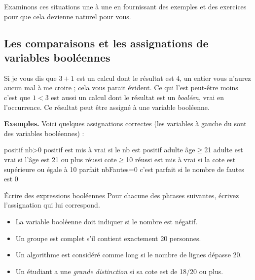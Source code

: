 		Examinons ces situations une à une
		en fournissant des exemples et des exercices
		pour que cela devienne naturel pour vous.
		
		\subsection{Les comparaisons et les assignations de variables booléennes}
		
			Si je vous dis que $3+1$ est un calcul
			dont le résultat est $4$, un entier
			vous n'aurez aucun mal à me croire ; 
			cela vous parait évident.
			Ce qui l'est peut-être moins c'est que $1<3$ est aussi
			un calcul dont le résultat est un \emph{booléen},
			vrai en l’occurrence. 
			Ce résultat peut être assigné à une variable booléenne.			

			\textbf{Exemples.}
			Voici quelques assignations correctes 
			(les variables à gauche du \Gets sont des variables booléennes) :
			\begin{LDA}
				\Let positif \Gets nb>0 \RComment positif est mis à vrai si le nb est positif 
				\Let adulte \Gets âge$\ge$21 \RComment adulte est vrai si l'âge est 21 ou plus
				\Let réussi \Gets cote$\ge$10 \RComment réussi est mis à vrai si la cote est supérieure ou égale à 10
				\Let parfait \Gets nbFautes=0 \RComment c'est parfait si le nombre de fautes est 0
			\end{LDA}
		
			\begin{Exercice}{Écrire des expressions booléennes}
				Pour chacune des phrases suivantes,
				écrivez l'assignation qui lui correspond.
				\begin{itemize}
				\item 
					La variable booléenne 
					doit indiquer si le nombre  est négatif.
				\item
					Un groupe est complet s'il contient exactement 20 personnes.
				\item
					Un algorithme est considéré comme long si le nombre de lignes
					dépasse 20.
				\item 
					Un étudiant a une \emph{grande distinction} si sa cote est
					de 18/20 ou plus.
				\end{itemize}
			\end{Exercice}

